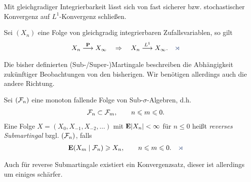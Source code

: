Mit gleichgradiger Integrierbarkeit lässt sich von fast sicherer bzw.
stochastischer Konvergenz auf $L^1$-Konvergenz schließen.

\begin{lem}
Sei $(X_n)$ eine Folge von gleichgradig integrierbaren Zufallsvariablen, so gilt
\begin{align*}
X_n \Pto X_\infty\quad \Rightarrow\quad 
X_n\lto{1} X_\infty.\fish
\end{align*}
\end{lem}


Die bisher definierten (Sub-/Super-)Martingale beschreiben die Abhängigkeit
zukünftiger Beobachtungen von den bisherigen. Wir benötigen allerdings auch die
andere Richtung.

\begin{defn}
\label{defn:1.9}
Sei $(\mathcal{F}_n)$ eine monoton fallende Folge von Sub-$\sigma$-Algebren, d.h.
\begin{align*}
\mathcal{F}_n\subset \mathcal{F}_m,\qquad n\leqslant m\leqslant 0.
\end{align*}
Eine Folge $X=(X_0,X_{-1},X_{-2},\ldots)$ mit $\mathbf{E} \lvert X_{n}\rvert < \infty$ für
$n\le 0$ heißt \emph{reverses Submartingal} bzgl.
$(\mathcal{F}_n)$, falls
\begin{align*}
\E(X_m\mid \FF_n) \ge X_n,\qquad n\le m\le 0.\fish
\end{align*}
\end{defn}

Auch für reverse Submartingale existiert ein Konvergenzsatz, dieser ist
allerdings um einiges schärfer.

